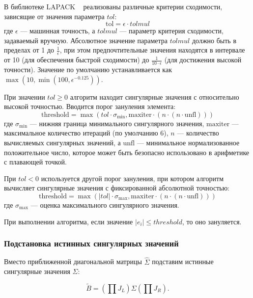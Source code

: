 В библиотеке LAPACK ~\cite{Anderson1999} реализованы различные критерии сходимости, зависящие от значения параметра \(tol\):
\begin{equation}
\text{tol} = \epsilon \cdot tolmul
\end{equation}
где \(\epsilon\) — машинная точность, а \(tolmul\) — параметр критерия сходимости, задаваемый вручную. Абсолютное значение параметра \(tolmul\) должно быть в пределах от 1 до \(\frac{1}{\epsilon}\), при этом предпочтительные значения находятся в интервале от 10 (для обеспечения быстрой сходимости) до \(\frac{1}{10 \cdot \epsilon}\) (для достижения высокой точности). Значение по умолчанию устанавливается как \(\max(10, \min(100, \epsilon^{-0.125}))\).

При значении \(tol \geq 0\) алгоритм находит сингулярные значения с относительно высокой точностью. Вводится порог зануления элемента:
\begin{equation}
\text{threshold} = \max(tol \cdot \sigma_{\text{min}}, \text{maxiter} \cdot (n \cdot (n \cdot \text{unfl})))
\end{equation}
где \(\sigma_{\text{min}}\) — нижняя граница минимального сингулярного значения, \(\text{maxiter}\) — максимальное количество итераций (по умолчанию 6), \(n\) — количество вычисляемых сингулярных значений, а \(\text{unfl}\) — минимальное нормализованное положительное число, которое может быть безопасно использовано в арифметике с плавающей точкой.

При \(tol < 0\) используется другой порог зануления, при котором алгоритм вычисляет сингулярные значения с фиксированной абсолютной точностью:
\begin{equation}
\text{threshold} = \max (|tol| \cdot \sigma_{\text{max}}, \text{maxiter} \cdot (n \cdot (n \cdot \text{unfl})))
\end{equation}
где \(\sigma_{\text{max}}\) — оценка максимального сингулярного значения.

При выполнении алгоритма, если значение \(|e_i| \le threshold\), то оно зануляется.

\subsubsection{Подстановка истинных сингулярных значений}

Вместо приближенной диагональной матрицы \( \widehat{\Sigma} \) подставим истинные сингулярные значения \( \Sigma \):

\begin{equation}
\tilde{B} = \left( \prod J_L \right) \Sigma \left( \prod J_R \right).
\end{equation}

